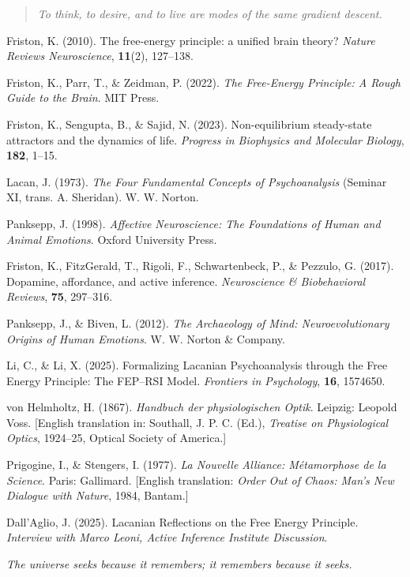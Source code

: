 \documentclass[12pt,a4paper]{article}
\begin{document}
\begin{quote}
\textit{To think, to desire, and to live are modes of the same gradient descent.}
\end{quote}



\newpage
\begin{thebibliography}{99}
Friston, K. (2010). The free-energy principle: a unified brain theory? \emph{Nature Reviews Neuroscience}, \textbf{11}(2), 127--138.

Friston, K., Parr, T., \& Zeidman, P. (2022). \emph{The Free-Energy Principle: A Rough Guide to the Brain}. MIT Press.

Friston, K., Sengupta, B., \& Sajid, N. (2023). Non-equilibrium steady-state attractors and the dynamics of life. \emph{Progress in Biophysics and Molecular Biology}, \textbf{182}, 1--15.

Lacan, J. (1973). \emph{The Four Fundamental Concepts of Psychoanalysis} (Seminar XI, trans. A. Sheridan). W. W. Norton.

Panksepp, J. (1998). \emph{Affective Neuroscience: The Foundations of Human and Animal Emotions}. Oxford University Press.

Friston, K., FitzGerald, T., Rigoli, F., Schwartenbeck, P., \& Pezzulo, G. (2017). Dopamine, affordance, and active inference. \emph{Neuroscience \& Biobehavioral Reviews}, \textbf{75}, 297--316.

Panksepp, J., \& Biven, L. (2012). \emph{The Archaeology of Mind: Neuroevolutionary Origins of Human Emotions}. W. W. Norton \& Company.

Li, C., \& Li, X. (2025). Formalizing Lacanian Psychoanalysis through the Free Energy Principle: The FEP–RSI Model. \emph{Frontiers in Psychology}, \textbf{16}, 1574650.

von Helmholtz, H. (1867). \emph{Handbuch der physiologischen Optik}. Leipzig: Leopold Voss.  
[English translation in: Southall, J. P. C. (Ed.), \emph{Treatise on Physiological Optics}, 1924–25, Optical Society of America.]

Prigogine, I., \& Stengers, I. (1977). \emph{La Nouvelle Alliance: Métamorphose de la Science}. Paris: Gallimard.  
[English translation: \emph{Order Out of Chaos: Man’s New Dialogue with Nature}, 1984, Bantam.]


Dall’Aglio, J. (2025). Lacanian Reflections on the Free Energy Principle. \emph{Interview with Marco Leoni, Active Inference Institute Discussion}.
\end{thebibliography}

\begin{center}
\textit{The universe seeks because it remembers; it remembers because it seeks.}
\end{center}
\end{document}
